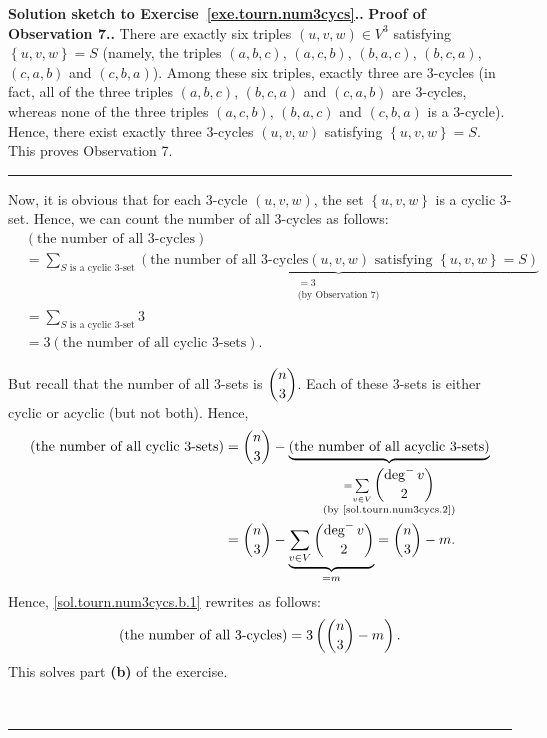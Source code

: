 \documentclass[numbers=enddot,12pt,final,onecolumn,notitlepage]{scrartcl}%
\newcounter{exer}
\theoremstyle{definition}
\newenvironment{proof}[1][Proof]{\noindent\textbf{#1.} }{\ \rule{0.5em}{0.5em}}
\let\sumnonlimits\sum
\renewcommand{\sum}{\sumnonlimits\limits}
\newcommand{\set}[1]{\left\{ #1 \right\}}
\newcommand{\tup}[1]{\left( #1 \right)}
\newcommand{\underbrack}[2]{\underbrace{#1}_{\substack{#2}}}
\begin{document}
\begin{proof}[Solution sketch to Exercise~\ref{exe.tourn.num3cycs}.]
\begin{proof}[Proof of Observation 7.]
There are exactly six triples $\tup{u, v, w} \in V^3$ satisfying
$\set{u, v, w} = S$ (namely, the triples $\tup{a, b, c}$,
$\tup{a, c, b}$, $\tup{b, a, c}$, $\tup{b, c, a}$, $\tup{c, a, b}$ and
$\tup{c, b, a}$). Among these six triples, exactly three are
$3$-cycles (in fact,
all of the three triples $\tup{a, b, c}$, $\tup{b, c, a}$ and
$\tup{c, a, b}$ are $3$-cycles, whereas none of the three triples
$\tup{a, c, b}$, $\tup{b, a, c}$ and $\tup{c, b, a}$ is a
$3$-cycle). Hence, there exist
exactly three $3$-cycles $\tup{u, v, w}$ satisfying
$\set{u, v, w} = S$. This proves Observation 7.
\end{proof}

Now, it is obvious that for each $3$-cycle $\tup{u, v, w}$, the set
$\set{u, v, w}$ is a cyclic 3-set. Hence, we can count the
number of all $3$-cycles as follows:
\begin{align}
&  \tup{\text{the number of all } 3\text{-cycles}} \nonumber \\
&= \sum_{S \text{ is a cyclic 3-set}}
      \underbrack{\tup{\text{the number of all } 3\text{-cycles}
                       \tup{u, v, w} \text{ satisfying }
                       \set{u, v, w} = S}
                 }{= 3 \\ \text{(by Observation 7)}} \nonumber \\
&= \sum_{S \text{ is a cyclic 3-set}} 3 \nonumber \\
&= 3 \tup{\text{the number of all cyclic 3-sets}} .
\label{sol.tourn.num3cycs.b.1}
\end{align}

But recall that the number of all 3-sets is $\dbinom{n}{3}$. Each of
these 3-sets is either cyclic or acyclic (but not both). Hence,
\begin{align*}
\tup{\text{the number of all cyclic 3-sets}}
&= \dbinom{n}{3}
   - \underbrack{\tup{\text{the number of all acyclic 3-sets}}
                }{= \sum_{v \in V} \dbinom{\deg^- v}{2} \\
                  \text{(by \eqref{sol.tourn.num3cycs.2})}}
\\
&= \dbinom{n}{3}
   - \underbrack{\sum_{v \in V} \dbinom{\deg^- v}{2}
                }{= m}
= \dbinom{n}{3} - m .
\end{align*}
Hence, \eqref{sol.tourn.num3cycs.b.1} rewrites as follows:
\[
\tup{\text{the number of all } 3\text{-cycles}}
= 3 \tup{\dbinom{n}{3} - m}.
\]
This solves part \textbf{(b)} of the exercise.


\end{proof}
\end{document}
